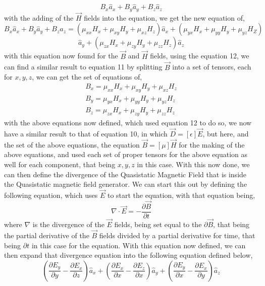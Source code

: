 \documentclass[]{article}
\begin{document}
\begin{equation}
B_x\hat{a}_x + B_y\hat{a}_y+B_z\hat{a}_z
\end{equation}
with the adding of the $\vec{H}$ fields into the equation, we get the new equation of,
\begin{equation}
B_x\hat{a}_x + B_y\hat{a}_y+B_z\hat{a}_z = (\mu_{xx}H_x+\mu_{xy}H_y + \mu_{xz}H_z)\hat{a}_x + (\mu_{yx}H_x + \mu_{yy}H_y + \mu_{yz}H_Z)
\end{equation}
\begin{equation}
\hat{a}_y + (\mu_{zx}H_x + \mu_{zy}H_y+ \mu_{zz}H_z)\hat{a}_z
\end{equation}
with this equation now found for the $\vec{B}$ and $\vec{H}$ fields, using the equation 12, we can find a similar result to equation 11 by splitting $\vec{B}$ into a set of tensors, each for $x,y,z$, we can get the set of equations of,
\begin{equation}
\begin{array}{c}
B_x = \mu_{xx}H_x + \mu_{xy}H_y + \mu_{xz}H_z \\
B_y = \mu_{yx}H_x + \mu_{yy}H_y + \mu_{yz}H_z \\
B_z = \mu_{zx}H_x + \mu_{zy}H_y + \mu_{zz}H_z
\end{array}
\end{equation}
with the above equations now defined, which used equation 12 to do so, we now have a similar result to that of equation 10, in which $\vec{D} = [\epsilon]\vec{E}$, but here, and the set of the above equations, the equation $\vec{B} = [\mu]\vec{H}$ for the making of the above equations, and used each set of proper tensors for the above equation as well for each component, that being $x,y,z$ in this case. With this now done, we can then define the divergence of the Quasistatic Magnetic Field that is inside the Quasistatic magnetic field generator. We can start this out by defining the following equation, which uses $\vec{E}$ to start the equation, with that equation being,
\begin{equation}
\nabla \cdot \vec{E} = -\frac{\partial{\vec{B}}}{\partial{t}}
\end{equation}
where $\nabla$ is the divergence of the $\vec{E}$ fields, being set equal to the $\partial{\vec{B}}$, that being the partial derivative of the $\vec{B}$ fields divided by a partial derivative for time, that being $\partial{t}$ in this case for the equation. With this equation now defined, we can then expand that divergence equation into the following equation defined below,
\begin{equation}
(\frac{\partial{E}_y}{\partial{y}} - \frac{\partial{E}_x}{\partial{z}})\hat{a}_x + (\frac{\partial{E}_x}{\partial{x}} - \frac{\partial{E}_z}{\partial{x}}) \hat{a}_y + (\frac{\partial{E}_y}{\partial{x}} - \frac{\partial{E}_x}{\partial{y}})\hat{a}_z
\end{equation}
\end{document}
